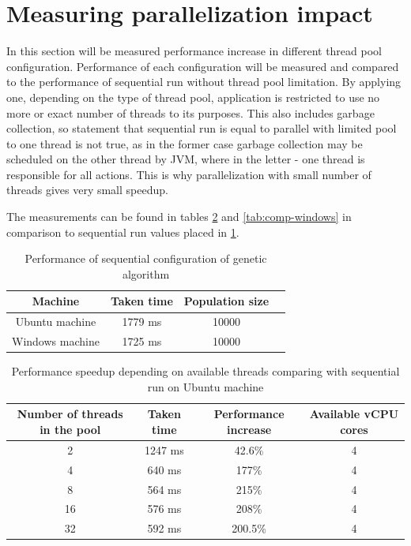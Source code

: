 \section{Measuring parallelization impact}

In this section will be measured performance increase in different thread pool configuration.
Performance of each configuration will be measured and compared to the performance of sequential run without thread pool limitation. By applying one, depending on the type of thread pool, application is restricted to use no more or exact number of threads to its purposes. This also includes garbage collection, so statement that sequential run is equal to parallel with limited pool to one thread is not true, as in the former case garbage collection may be scheduled on the other thread by JVM, where in the letter - one thread is responsible for all actions. This is why parallelization with small number of threads gives very small speedup.

The measurements can be found in tables \ref{tab:comp-ubuntu} and \ref{tab:comp-windows} in comparison to sequential run values placed in \ref{tab:win-ub-perf}.

\begin{table}[h]
\centering\caption{Performance of sequential configuration of genetic algorithm \label{tab:win-ub-perf}}
\begin{tabular}{|c|c|c|c|}
\hline
\textbf{Machine} & \textbf{Taken time} & \textbf{Population size} \\
\hline
 Ubuntu machine & 1779 ms & 10000 \\
\hline
 Windows machine & 1725 ms & 10000 \\
\hline
\end{tabular}
\end{table}

\begin{table}[h]
\centering\caption{Performance speedup depending on available threads comparing with sequential run on Ubuntu machine \label{tab:comp-ubuntu}}
\begin{tabular}{|c|c|c|c|}
\hline
\textbf{Number of threads in the pool} & \textbf{Taken time} & \textbf{Performance increase} & Available vCPU cores \\
\hline
 2 & 1247 ms & 42.6\% & 4 \\
\hline
 4 & 640 ms & 177\% & 4 \\
\hline
 8 & 564 ms & 215\% & 4 \\
\hline
 16 & 576 ms & 208\% & 4 \\
\hline
 32 & 592 ms & 200.5\% & 4 \\
\hline
\end{tabular}
\end{table}


